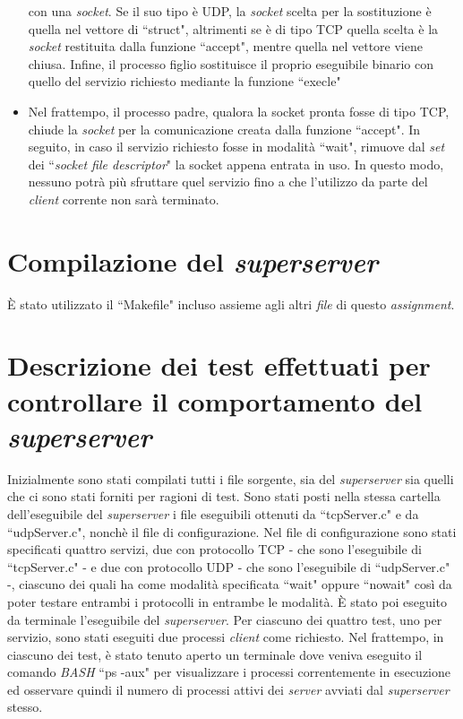 \documentclass[a4paper, 12pt]{report}
\begin{document}
\begin{itemize}
    con una \textit{socket}. Se il suo tipo è UDP, la \textit{socket} scelta per la sostituzione è quella nel vettore di ``struct", altrimenti se è di tipo TCP
    quella scelta è la \textit{socket} restituita dalla funzione ``accept", mentre quella nel vettore viene chiusa. Infine, il processo figlio sostituisce il proprio
    eseguibile binario con quello del servizio richiesto mediante la funzione ``execle"
    \item Nel frattempo, il processo padre, qualora la socket pronta fosse di tipo TCP, chiude la \textit{socket} per la comunicazione creata dalla funzione ``accept".
    In seguito, in caso il servizio richiesto fosse in modalità ``wait", rimuove dal \textit{set} dei ``\textit{socket file descriptor}" la socket appena entrata in
    uso. In questo modo, nessuno potrà più sfruttare quel servizio fino a che l'utilizzo da parte del \textit{client} corrente non sarà terminato. 
\end{itemize}

\section{Compilazione del \textit{superserver}}

È stato utilizzato il ``Makefile" incluso assieme agli altri \textit{file} di questo \textit{assignment}.

\section{Descrizione dei test effettuati per controllare il comportamento del \textit{superserver}}

Inizialmente sono stati compilati tutti i file sorgente, sia del \textit{superserver} sia quelli che ci sono stati forniti per ragioni di test.\newline
Sono stati posti nella stessa cartella dell'eseguibile del \textit{superserver} i file eseguibili ottenuti da ``tcpServer.c" e da ``udpServer.c", nonchè il file di
configurazione. Nel file di configurazione sono stati specificati quattro servizi, due con protocollo TCP - che sono l'eseguibile di ``tcpServer.c" - e due con protocollo UDP - che sono l'eseguibile di ``udpServer.c" -, ciascuno dei quali
ha come modalità specificata ``wait" oppure ``nowait" così da poter testare entrambi i protocolli in entrambe le modalità. È stato poi eseguito da terminale l'eseguibile
del \textit{superserver}. Per ciascuno dei quattro test, uno per servizio, sono stati eseguiti due processi \textit{client} come richiesto. Nel frattempo, in ciascuno
dei test, è stato tenuto aperto un terminale dove veniva eseguito il comando \textit{BASH} ``ps -aux" per visualizzare i processi correntemente in esecuzione ed osservare
quindi il numero di processi attivi dei \textit{server} avviati dal \textit{superserver} stesso.
\end{document}
